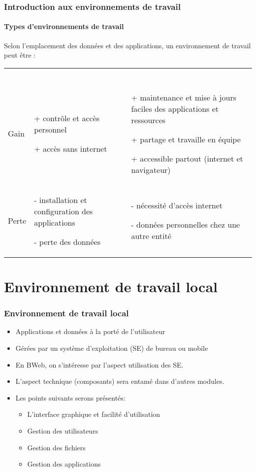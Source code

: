 \documentclass[xcolor=table]{beamer}
\begin{document}
\begin{frame}
\frametitle{Introduction aux environnements de travail}
\framesubtitle{Types d'environnements de travail}

Selon l'emplacement des données et des applications, un environnement de travail peut être : 


\begin{tabular}{p{}p{}p{}}
	\rowcolor{darkblue}
	& \textcolor{white}{Local} & \textcolor{white}{Distant} \\
	
	Gain &
	+ contrôle et accès personnel 
	
	+ accès sans internet

	 & 
	+ maintenance et mise à jours faciles des applications et ressources
	
	+ partage et travaille en équipe
	
	+ accessible partout (internet et navigateur)
	 \\
	
	Perte &
	- installation et configuration des applications
	
	- perte des données
	&
	- nécessité d'accès internet
	
	- données personnelles chez une autre entité 
	\\
\end{tabular}

\end{frame}

\section{Environnement de travail local}

\begin{frame}
\frametitle{Environnement de travail local}

\begin{itemize}
	\item Applications et données à la porté de l'utilisateur 
	\item Gérées par un système d'exploitation (SE) de bureau ou mobile 
	\item En BWeb, on s'intéresse par l'aspect utilisation des SE. 
	\item L'aspect technique (composants) sera entamé dans d'autres modules. 
	\item Les points suivants serons présentés:
	\begin{itemize}
		\item L'interface graphique et facilité d'utilisation 
		\item Gestion des utilisateurs
		\item Gestion des fichiers
		\item Gestion des applications
	\end{itemize}
	
\end{itemize}

\end{frame}
\end{document}
